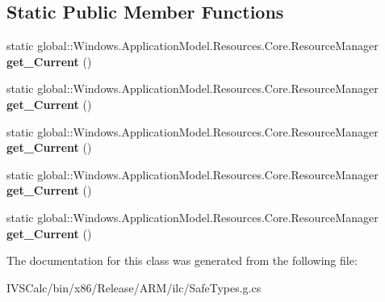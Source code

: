 \subsection*{Static Public Member Functions}
\begin{DoxyCompactItemize}
\item 
\mbox{\label{class_windows_1_1_application_model_1_1_resources_1_1_core_1_1_resource_manager_addc1fb1c70da2d8335cfed0088b5e2fc}} 
static global\+::\+Windows.\+Application\+Model.\+Resources.\+Core.\+Resource\+Manager {\bfseries get\+\_\+\+Current} ()
\item 
\mbox{\label{class_windows_1_1_application_model_1_1_resources_1_1_core_1_1_resource_manager_addc1fb1c70da2d8335cfed0088b5e2fc}} 
static global\+::\+Windows.\+Application\+Model.\+Resources.\+Core.\+Resource\+Manager {\bfseries get\+\_\+\+Current} ()
\item 
\mbox{\label{class_windows_1_1_application_model_1_1_resources_1_1_core_1_1_resource_manager_addc1fb1c70da2d8335cfed0088b5e2fc}} 
static global\+::\+Windows.\+Application\+Model.\+Resources.\+Core.\+Resource\+Manager {\bfseries get\+\_\+\+Current} ()
\item 
\mbox{\label{class_windows_1_1_application_model_1_1_resources_1_1_core_1_1_resource_manager_addc1fb1c70da2d8335cfed0088b5e2fc}} 
static global\+::\+Windows.\+Application\+Model.\+Resources.\+Core.\+Resource\+Manager {\bfseries get\+\_\+\+Current} ()
\item 
\mbox{\label{class_windows_1_1_application_model_1_1_resources_1_1_core_1_1_resource_manager_addc1fb1c70da2d8335cfed0088b5e2fc}} 
static global\+::\+Windows.\+Application\+Model.\+Resources.\+Core.\+Resource\+Manager {\bfseries get\+\_\+\+Current} ()
\end{DoxyCompactItemize}


The documentation for this class was generated from the following file\+:\begin{DoxyCompactItemize}
\item 
I\+V\+S\+Calc/bin/x86/\+Release/\+A\+R\+M/ilc/Safe\+Types.\+g.\+cs\end{DoxyCompactItemize}
